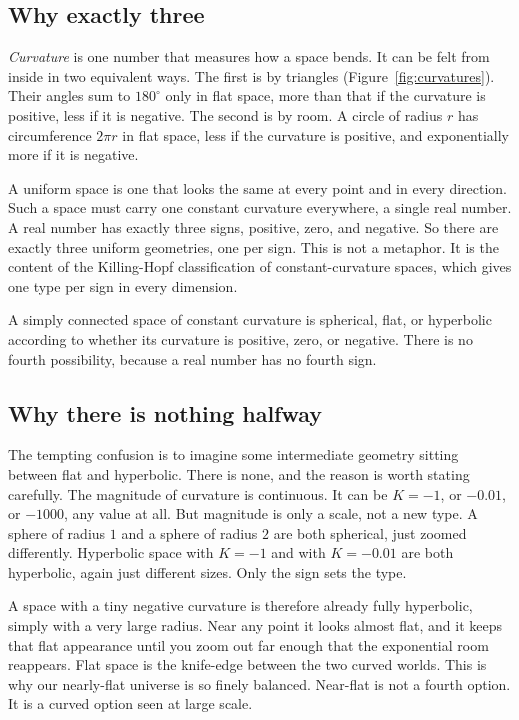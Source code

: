 \subsection{Why exactly three}

\emph{Curvature} is one number that measures how a space bends. It can be felt from inside in two equivalent ways. The first is by triangles (Figure~\ref{fig:curvatures}). Their angles sum to $180^\circ$ only in flat space, more than that if the curvature is positive, less if it is negative. The second is by room. A circle of radius $r$ has circumference $2\pi r$ in flat space, less if the curvature is positive, and exponentially more if it is negative.

A uniform space is one that looks the same at every point and in every direction. Such a space must carry one constant curvature everywhere, a single real number. A real number has exactly three signs, positive, zero, and negative. So there are exactly three uniform geometries, one per sign. This is not a metaphor. It is the content of the Killing-Hopf classification of constant-curvature spaces, which gives one type per sign in every dimension.

\begin{theorem}
A simply connected space of constant curvature is spherical, flat, or hyperbolic according to whether its curvature is positive, zero, or negative. There is no fourth possibility, because a real number has no fourth sign.
\end{theorem}

\subsection{Why there is nothing halfway}

The tempting confusion is to imagine some intermediate geometry sitting between flat and hyperbolic. There is none, and the reason is worth stating carefully. The magnitude of curvature is continuous. It can be $K = -1$, or $-0.01$, or $-1000$, any value at all. But magnitude is only a scale, not a new type. A sphere of radius $1$ and a sphere of radius $2$ are both spherical, just zoomed differently. Hyperbolic space with $K = -1$ and with $K = -0.01$ are both hyperbolic, again just different sizes. Only the sign sets the type.

A space with a tiny negative curvature is therefore already fully hyperbolic, simply with a very large radius. Near any point it looks almost flat, and it keeps that flat appearance until you zoom out far enough that the exponential room reappears. Flat space is the knife-edge between the two curved worlds. This is why our nearly-flat universe is so finely balanced. Near-flat is not a fourth option. It is a curved option seen at large scale.

